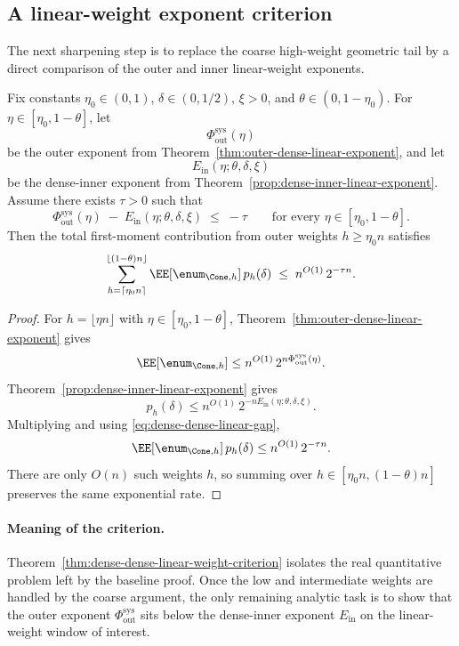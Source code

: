\subsection{A linear-weight exponent criterion}
\label{sec:integration-dense-dense-linear}

The next sharpening step is to replace the coarse high-weight geometric tail by a direct comparison of the outer and
inner linear-weight exponents.

\begin{theorem}
\label{thm:dense-dense-linear-weight-criterion}
Fix constants \(\eta_0\in(0,1)\), \(\delta\in(0,1/2)\), \(\xi>0\), and \(\theta\in(0,1-\eta_0)\).
For \(\eta\in[\eta_0,1-\theta]\), let
\[
\Phi_{\mathrm{out}}^{\mathrm{sys}}(\eta)
\]
be the outer exponent from Theorem~\ref{thm:outer-dense-linear-exponent}, and let
\[
E_{\mathrm{in}}(\eta;\theta,\delta,\xi)
\]
be the dense-inner exponent from Theorem~\ref{prop:dense-inner-linear-exponent}.
Assume there exists \(\tau>0\) such that
\begin{equation}
\label{eq:dense-dense-linear-gap}
\Phi_{\mathrm{out}}^{\mathrm{sys}}(\eta)
\;-\;
E_{\mathrm{in}}(\eta;\theta,\delta,\xi)
\;\le\;
-\tau
\qquad\text{for every }\eta\in[\eta_0,1-\theta].
\end{equation}
Then the total first-moment contribution from outer weights \(h\ge \eta_0 n\) satisfies
\[
\sum_{h=\lceil \eta_0 n\rceil}^{\lfloor (1-\theta)n\rfloor}
\EE[\enum_{\Cone,h}]\,p_h(\delta)
\;\le\;
n^{O(1)}\,2^{-\tau n}.
\]
\end{theorem}

\begin{proof}
For \(h=\lfloor \eta n\rfloor\) with \(\eta\in[\eta_0,1-\theta]\), Theorem~\ref{thm:outer-dense-linear-exponent} gives
\[
\EE[\enum_{\Cone,h}]
\le
n^{O(1)}\,2^{n\Phi_{\mathrm{out}}^{\mathrm{sys}}(\eta)}.
\]
Theorem~\ref{prop:dense-inner-linear-exponent} gives
\[
p_h(\delta)
\le
n^{O(1)}\,2^{-nE_{\mathrm{in}}(\eta;\theta,\delta,\xi)}.
\]
Multiplying and using \eqref{eq:dense-dense-linear-gap},
\[
\EE[\enum_{\Cone,h}]\,p_h(\delta)
\le
n^{O(1)}\,2^{-\tau n}.
\]
There are only \(O(n)\) such weights \(h\), so summing over
\(h\in[\eta_0 n,(1-\theta)n]\) preserves the same exponential rate.
\end{proof}

\paragraph{Meaning of the criterion.}
Theorem~\ref{thm:dense-dense-linear-weight-criterion} isolates the real quantitative problem left by the baseline proof.
Once the low and intermediate weights are handled by the coarse argument, the only remaining analytic task is to show
that the outer exponent \(\Phi_{\mathrm{out}}^{\mathrm{sys}}\) sits below the dense-inner exponent
\(E_{\mathrm{in}}\) on the linear-weight window of interest.

